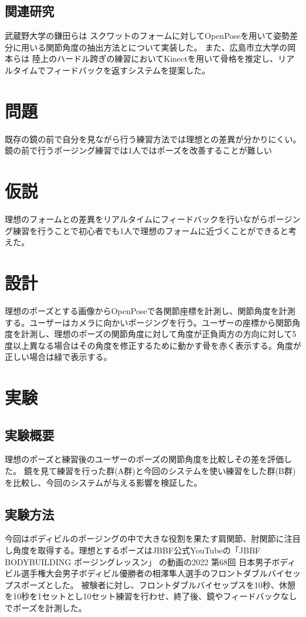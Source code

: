 \documentclass[a4j,10pt]{jsarticle}
\begin{document}
\subsection{関連研究}
武蔵野大学の鎌田らは \cite{Relatedresearch1}スクワットのフォームに対してOpenPoseを用いて姿勢差分に用いる関節角度の抽出方法とについて実装した。
また、広島市立大学の岡本らは \cite{Relatedresearch2}陸上のハードル跨ぎの練習においてKinectを用いて骨格を推定し、リアルタイムでフィードバックを返すシステムを提案した。



\section{問題}
既存の鏡の前で自分を見ながら行う練習方法では理想との差異が分かりにくい。鏡の前で行うポージング練習では1人ではポーズを改善することが難しい

\section{仮説}
理想のフォームとの差異をリアルタイムにフィードバックを行いながらポージング練習を行うことで初心者でも1人で理想のフォームに近づくことができると考えた。


\section{設計}
理想のポーズとする画像からOpenPoseで各関節座標を計測し、関節角度を計測する。ユーザーはカメラに向かいポージングを行う。ユーザーの座標から関節角度を計測し、理想のポーズの関節角度に対して角度が正負両方の方向に対して5度以上異なる場合はその角度を修正するために動かす骨を赤く表示する。角度が正しい場合は緑で表示する。
\section{実験}
\subsection{実験概要}
理想のポーズと練習後のユーザーのポーズの関節角度を比較しその差を評価した。
鏡を見て練習を行った群(A群)と今回のシステムを使い練習をした群(B群)を比較し、今回のシステムが与える影響を検証した。
\subsection{実験方法}
今回はボディビルのポージングの中で大きな役割を果たす肩関節、肘関節に注目し角度を取得する。理想とするポーズはJBBF公式YouTubeの「JBBF　BODYBUILDING ポージングレッスン」\cite{aizawa}
の動画の2022 第68回 日本男子ボディビル選手権大会男子ボディビル優勝者の相澤隼人選手のフロントダブルバイセップスポーズとした。
被験者に対し、フロントダブルバイセップスを10秒、休憩を10秒を1セットとし10セット練習を行わせ、終了後、鏡やフィードバックなしでポーズを計測した。
\end{document}

